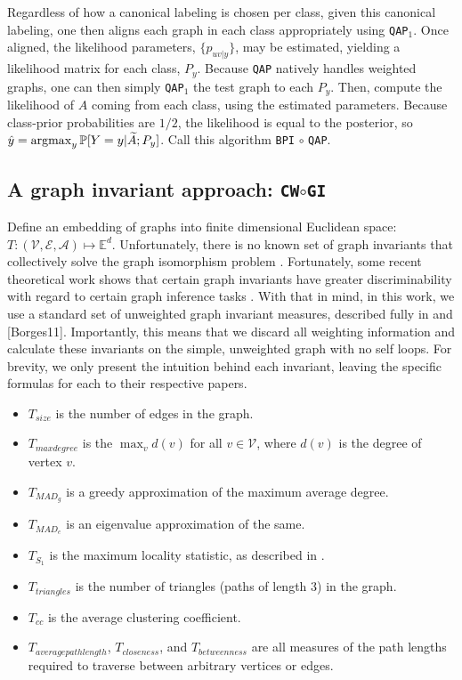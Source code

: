 \documentclass{article} %
\newcommand{\argmax}{\operatornamewithlimits{argmax}}
\newcommand{\EE}{\mathbb{E}}           %
\newcommand{\PP}{\mathbb{P}}           %
\providecommand{\mc}[1]{\mathcal{#1}}
\providecommand{\mh}[1]{\hat{#1}}
\providecommand{\mt}[1]{\widetilde{#1}}
\newcommand{\qap}{\texttt{QAP} }
\newcommand{\qapa}{\texttt{QAP}$_1$ }
\begin{document}
Regardless of how a canonical labeling is chosen per class, given this canonical labeling, one then aligns each graph in each class appropriately using \texttt{QAP}$_1$.  Once aligned, the likelihood parameters, $\{p_{uv|y}\}$, may be estimated, yielding a likelihood matrix for each class, $P_y$. Because \qap natively handles weighted graphs, one can then simply \qapa the test graph to each $P_y$.  Then, compute the likelihood of $A$ coming from each class, using the estimated parameters.  Because class-prior probabilities are $1/2$, the likelihood is equal to the posterior, so $\mh{y}=\argmax_y \PP[Y=y | \mt{A}; P_y]$. Call this algorithm \texttt{BPI} $\circ$ \texttt{QAP}.




\subsection{A graph invariant approach: \texttt{CW}$\circ$\texttt{GI} } %
\label{sub:graph_invariant_approach}

Define an embedding of graphs into finite dimensional Euclidean space: $T: (\mc{V},\mc{E},\mc{A}) \mapsto \EE^d$.  Unfortunately, there is no known set of graph invariants that collectively solve the graph isomorphism problem \cite{Conte2004}.  Fortunately, some recent theoretical work shows that certain graph invariants have greater discriminability with regard to certain graph inference tasks \cite{Ruhkhin2011}. With that in mind, in this work, we use a standard set of unweighted graph invariant measures, described fully in \cite{CPP11} and \cite{} [Borges11]. Importantly, this means that we discard all weighting information and calculate these invariants on the simple, unweighted graph with no self loops. For brevity, we only present the intuition behind each invariant, leaving the specific formulas for each to their respective papers.
\begin{itemize}
	\item $T_{size}$ is the number of edges in the graph.
	\item $T_{maxdegree}$ is the $\max_v d(v)$ for all $v \in \mc{V}$, where $d(v)$ is the degree of vertex $v$.
	\item $T_{MAD_g}$ is a greedy approximation of the maximum average degree.
	\item $T_{MAD_e}$ is an eigenvalue approximation of the same.
	\item $T_{S_1}$ is the maximum locality statistic, as described in \cite{Priebe}.
	\item $T_{triangles}$ is the number of triangles (paths of length 3) in the graph.
	\item $T_{cc}$ is the average clustering coefficient.
	\item $T_{averagepathlength}$, $T_{closeness}$, and $T_{betweenness}$ are all measures of the path lengths required to traverse between arbitrary vertices or edges.
\end{itemize}
\end{document}
